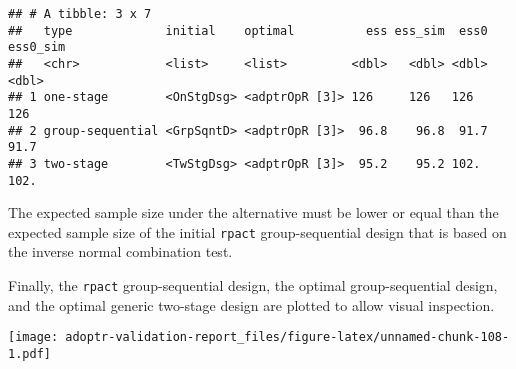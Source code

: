 \documentclass[
]{book}
\newenvironment{Shaded}{\begin{snugshade}}{\end{snugshade}}
\newcommand{\DecValTok}[1]{\textcolor[rgb]{0.00,0.00,0.81}{#1}}
\newcommand{\KeywordTok}[1]{\textcolor[rgb]{0.13,0.29,0.53}{\textbf{#1}}}
\newcommand{\NormalTok}[1]{#1}
\newcommand{\OperatorTok}[1]{\textcolor[rgb]{0.81,0.36,0.00}{\textbf{#1}}}
\newcommand{\StringTok}[1]{\textcolor[rgb]{0.31,0.60,0.02}{#1}}
\begin{document}
\begin{verbatim}
## # A tibble: 3 x 7
##   type             initial    optimal          ess ess_sim  ess0 ess0_sim
##   <chr>            <list>     <list>         <dbl>   <dbl> <dbl>    <dbl>
## 1 one-stage        <OnStgDsg> <adptrOpR [3]> 126     126   126      126  
## 2 group-sequential <GrpSqntD> <adptrOpR [3]>  96.8    96.8  91.7     91.7
## 3 two-stage        <TwStgDsg> <adptrOpR [3]>  95.2    95.2 102.     102.
\end{verbatim}

The expected sample size under the alternative must be lower or equal than
the expected sample size of the initial \texttt{rpact} group-sequential design that
is based on the inverse normal combination test.

\begin{Shaded}
\end{Shaded}

Finally, the \texttt{rpact} group-sequential design,
the optimal group-sequential design, and the optimal generic two-stage design
are plotted to allow visual inspection.

\texttt{[image: adoptr-validation-report\_files/figure-latex/unnamed-chunk-108-1.pdf]}

  
\end{document}
